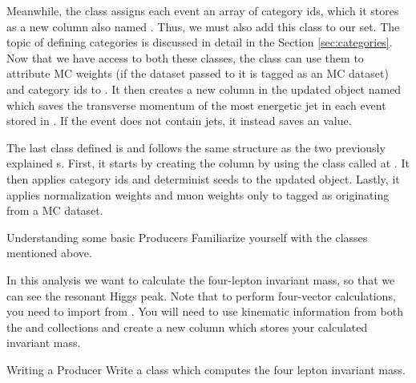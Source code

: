 Meanwhile, the  class assigns each event an array of category ids, which it stores as a new column also named . Thus, we must also add this class to our  set. The topic of defining categories is discussed in detail in the Section \ref{sec:categories}. Now that we have access to both these  classes, the  class can use them to attribute MC weights (if the dataset passed to it is tagged as an MC dataset) and category ids to . It then creates a new column in the updated  object named  which saves the transverse momentum of the most energetic jet in each event stored in . If the event does not contain jets, it instead saves an  value. 

The last  class defined is  and follows the same structure as the  two previously explained s. First, it starts by creating the  column by using the  class  called at . It then applies category ids and determinist seeds to the updated  object. Lastly, it applies normalization weights and muon weights only to  tagged as originating from a MC dataset. 

\begin{exercise}{Understanding some basic Producers}
	Familiarize yourself with the  classes mentioned above.
\end{exercise}

In this  analysis we want to calculate the four-lepton invariant mass, so that we can see the resonant Higgs peak. Note that to perform four-vector calculations, you need to import  from . You will need to use kinematic information from both the  and  collections and create a new column which stores your calculated invariant mass.

\begin{exercise}{Writing a Producer}
	Write a  class which computes the four lepton invariant mass. 
\end{exercise}
 
